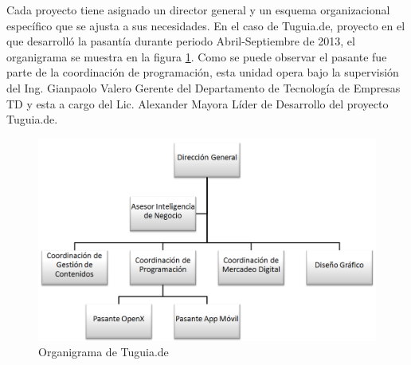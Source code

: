 Cada proyecto tiene asignado un director general y un esquema organizacional específico que se ajusta a sus necesidades. En el caso de Tuguia.de, proyecto en el que desarrolló la pasantía durante periodo Abril-Septiembre de 2013, el organigrama se muestra en la figura \ref{fig:ogtgd}. Como se puede observar el pasante fue parte de la coordinación de programación, esta unidad opera bajo la supervisión del Ing. Gianpaolo Valero Gerente del Departamento de Tecnología de Empresas TD y esta a cargo del Lic. Alexander Mayora Líder de Desarrollo del proyecto Tuguia.de.

\begin{figure}[h]
	\begin{center}
		\includegraphics[scale=0.4]{imagenes/organigrama.png}
	\end{center}
	\caption{
		\label{fig:ogtgd}
		Organigrama de Tuguia.de
	}
\end{figure}
 